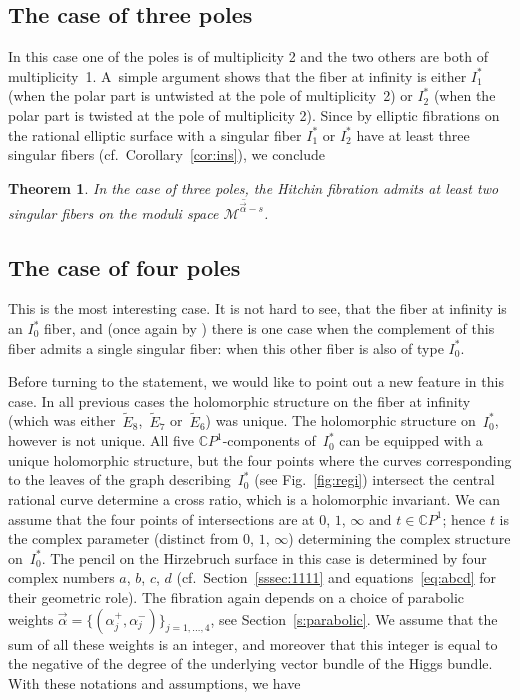 \documentclass[10pt,a4paper]{amsart}
\newcommand{\CP}[1]{\mathbb{C}P^{#1}} %
\newcommand{\Et}[1]{\widetilde{E}_{#1}} %
\newcommand{\Mod}{{\mathcal M}} %
\numberwithin{equation}{section}
\newtheorem{thm}[prop]{Theorem}
\begin{document}
\subsection{The case of three poles}\label{ss:ThreePoles}
In this case one of the poles is of multiplicity 2 and the two others
are both of multiplicity~1. A~simple argument shows that the
fiber at infinity is either $I_1^*$ (when the polar part is untwisted
at the pole of multiplicity~2) or $I_2^*$
(when the polar part is twisted at the pole of multiplicity 2).
Since by \cite[Section~6]{SSS} elliptic fibrations on the rational elliptic
surface with a singular fiber $I_1^*$ or $I_2^*$ have at least three
singular fibers (cf.\ Corollary~\ref{cor:ins}), we conclude

\begin{thm}\label{thm:ThreePoles}
In the case of three poles, the Hitchin fibration admits at least two
singular fibers on the moduli space ${\overline{\Mod ^{\vec{\alpha}-s}}}$.
\end{thm}

\subsection{The case of four poles}\label{ss:FourPoles}
This is the most interesting case. It is not hard to see, that the
fiber at infinity is an $I_0^*$ fiber, and (once again by
\cite[Section~6]{SSS}) there is one case when the complement of this
fiber admits a single singular fiber: when this other fiber is also of
type $I_0^*$.

Before turning to the statement, we would like to point out a new
feature in this case. In all previous cases the holomorphic structure
on the fiber at infinity (which was either~$\Et8$,~$\Et7$ or~$\Et6$) was
unique. The holomorphic structure on~$I_0^*$, however is not
unique. All five $\CP{1}$-components of~$I_0^*$ can be equipped with a
unique holomorphic structure, but the four points where the curves
corresponding to the leaves of the graph describing~$I_0^*$ (see
Fig.~\ref{fig:regi}) intersect the central rational curve determine
a cross ratio, which is a holomorphic invariant.
We can assume that the four points of intersections are at
$0$, $1$, $\infty$ and $t\in \CP{1}$; hence $t$ is the complex parameter
(distinct from $0$, $1$, $\infty$) determining the complex structure on~$I_0^*$. The pencil {on the Hirzebruch surface} in this case is determined by four complex numbers
$a$, $b$, $c$, $d$ (cf.\ Section~\ref{sssec:1111} and equations~\eqref{eq:abcd} for their geometric role).
The fibration again depends on a choice of parabolic weights
$\vec{\alpha} = \{ (\alpha_j^+, \alpha_j^-) \}_{j=1,\ldots ,4}$, see Section~\ref{s:parabolic}.
We assume that the sum of all these weights is an integer, and moreover that
this integer is equal to the negative of the degree of the underlying vector
bundle of the Higgs bundle. With these notations and assumptions, we have
\end{document}
